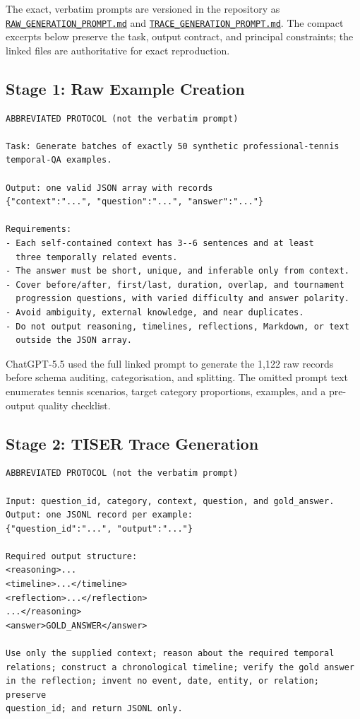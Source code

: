 \documentclass[conference]{IEEEtran}
\begin{document}
The exact, verbatim prompts are versioned in the repository as
\href{https://github.com/thestbobo/tiser_temporal_reasoning_extension/blob/main/docs/extensions/tennis_domain_adaptation/RAW_GENERATION_PROMPT.md}{\texttt{RAW\_GENERATION\_PROMPT.md}} and
\href{https://github.com/thestbobo/tiser_temporal_reasoning_extension/blob/main/docs/extensions/tennis_domain_adaptation/TRACE_GENERATION_PROMPT.md}{\texttt{TRACE\_GENERATION\_PROMPT.md}}.
The compact excerpts below preserve the task, output contract, and principal constraints; the linked files are authoritative for exact reproduction.

\subsection{Stage 1: Raw Example Creation}

\begin{lstlisting}[style=prompt]
ABBREVIATED PROTOCOL (not the verbatim prompt)

Task: Generate batches of exactly 50 synthetic professional-tennis
temporal-QA examples.

Output: one valid JSON array with records
{"context":"...", "question":"...", "answer":"..."}

Requirements:
- Each self-contained context has 3--6 sentences and at least
  three temporally related events.
- The answer must be short, unique, and inferable only from context.
- Cover before/after, first/last, duration, overlap, and tournament
  progression questions, with varied difficulty and answer polarity.
- Avoid ambiguity, external knowledge, and near duplicates.
- Do not output reasoning, timelines, reflections, Markdown, or text
  outside the JSON array.
\end{lstlisting}

ChatGPT-5.5 used the full linked prompt to generate the 1,122 raw records before schema auditing, categorisation, and splitting. The omitted prompt text enumerates tennis scenarios, target category proportions, examples, and a pre-output quality checklist.

\subsection{Stage 2: TISER Trace Generation}

\begin{lstlisting}[style=prompt]
ABBREVIATED PROTOCOL (not the verbatim prompt)

Input: question_id, category, context, question, and gold_answer.
Output: one JSONL record per example:
{"question_id":"...", "output":"..."}

Required output structure:
<reasoning>...
<timeline>...</timeline>
<reflection>...</reflection>
...</reasoning>
<answer>GOLD_ANSWER</answer>

Use only the supplied context; reason about the required temporal
relations; construct a chronological timeline; verify the gold answer
in the reflection; invent no event, date, entity, or relation; preserve
question_id; and return JSONL only.
\end{lstlisting}
\end{document}
